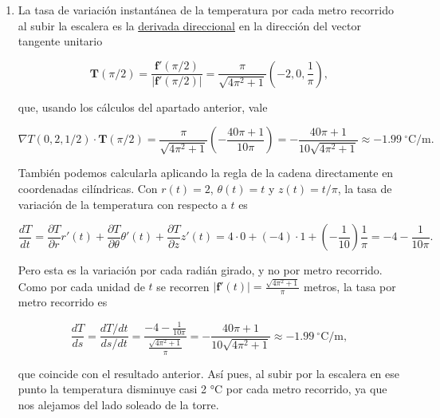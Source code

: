 \documentclass[
  spanish,
  a4paper,
]{scrreport}
\theoremstyle{definition}
\theoremstyle{remark}
\begin{document}
\begin{tcolorbox}
\begin{enumerate}
  Así pues,

  \[
  \operatorname{sen}(\varphi) = \frac{\frac{40\pi+1}{10\pi}}{\frac{\sqrt{2001}}{10}\cdot\frac{\sqrt{4\pi^2+1}}{\pi}} = \frac{40\pi+1}{\sqrt{2001}\sqrt{4\pi^2+1}} \approx 0.4451,
  \]

  de donde \(\varphi = \operatorname{arcsen}(0.4451) \approx 0.4612\)
  rad \(\approx 26.43^\circ\).

  Como el producto escalar es negativo, el gradiente forma un ángulo
  obtuso \(\beta \approx 116.43^\circ\) con la dirección de subida de la
  escalera, es decir, apunta hacia el lado del plano normal por el que
  se baja la escalera.
\item
  La tasa de variación instantánea de la temperatura por cada metro
  recorrido al subir la escalera es la
  \href{https://aprendeconalf.es/analisis-manual/13-derivadas-funciones-varias-variables.html\#thm-derivada-direccional}{derivada
  direccional} en la dirección del vector tangente unitario

  \[
  \mathbf{T}(\pi/2) = \frac{\mathbf{f}'(\pi/2)}{|\mathbf{f}'(\pi/2)|} = \frac{\pi}{\sqrt{4\pi^2+1}}\left(-2, 0, \frac{1}{\pi}\right),
  \]

  que, usando los cálculos del apartado anterior, vale

  \[
  \nabla T(0,2,1/2)\cdot \mathbf{T}(\pi/2) = \frac{\pi}{\sqrt{4\pi^2+1}}\left(-\frac{40\pi+1}{10\pi}\right) = -\frac{40\pi + 1}{10\sqrt{4\pi^2+1}} \approx -1.99\ ^\circ\mathrm{C/m}.
  \]

  También podemos calcularla aplicando la regla de la cadena
  directamente en coordenadas cilíndricas. Con \(r(t) = 2\),
  \(\theta(t) = t\) y \(z(t) = t/\pi\), la tasa de variación de la
  temperatura con respecto a \(t\) es

  \[
  \frac{dT}{dt} = \frac{\partial T}{\partial r}r'(t) + \frac{\partial T}{\partial \theta}\theta'(t) + \frac{\partial T}{\partial z}z'(t) = 4\cdot 0 + (-4)\cdot 1 + \left(-\frac{1}{10}\right)\frac{1}{\pi} = -4 - \frac{1}{10\pi}.
  \]

  Pero esta es la variación por cada radián girado, y no por metro
  recorrido. Como por cada unidad de \(t\) se recorren
  \(|\mathbf{f}'(t)| = \frac{\sqrt{4\pi^2+1}}{\pi}\) metros, la tasa por
  metro recorrido es

  \[
  \frac{dT}{ds} = \frac{dT/dt}{ds/dt} = \frac{-4 - \frac{1}{10\pi}}{\frac{\sqrt{4\pi^2+1}}{\pi}} = -\frac{40\pi + 1}{10\sqrt{4\pi^2+1}} \approx -1.99\ ^\circ\mathrm{C/m},
  \]

  que coincide con el resultado anterior. Así pues, al subir por la
  escalera en ese punto la temperatura disminuye casi 2 °C por cada
  metro recorrido, ya que nos alejamos del lado soleado de la torre.
\end{enumerate}

\end{tcolorbox}
\end{document}
